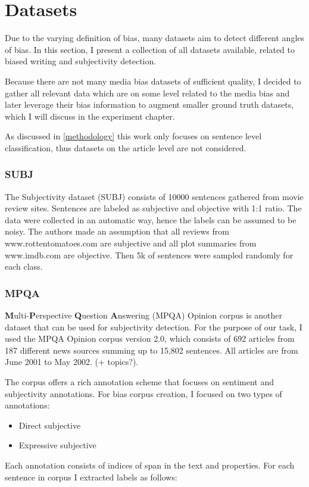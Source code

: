 \chapter{Datasets} \label{datasets}
Due to the varying definition of bias, many datasets aim to detect different angles of bias. In this section, I present a collection of all datasets available, related to biased writing and subjectivity detection.

Because there are not many media bias datasets of sufficient quality, I decided to gather all relevant data which are on some level related to the media bias and later leverage their bias information to augment smaller ground truth datasets, which I will discuss in the experiment chapter.

As discussed in \ref{methodology} this work only focuses on sentence level classification, thus datasets on the article level are not considered.



\subsection{SUBJ}
The Subjectivity dataset (SUBJ) \cite{Pang+Lee:04a} consists of 10000 sentences gathered from movie review sites. Sentences are labeled as subjective and objective with 1:1 ratio. The data were collected in an automatic way, hence the labels can be assumed to be noisy. The authors made an assumption that all reviews from www.rottentomatoes.com are subjective and all plot summaries from www.imdb.com are objective. Then 5k of sentences were sampled randomly for each class.




\subsection{MPQA}
\textbf{M}ulti-\textbf{P}erspective \textbf{Q}uestion \textbf{A}nswering (MPQA) Opinion corpus is another dataset that can be used for subjectivity detection. For the purpose of our task, I used the MPQA Opinion corpus version 2.0, which consists of 692 articles from 187 different news sources summing up to 15,802 sentences. All articles are from June 2001 to May 2002. (+ topics?).

The corpus offers a rich annotation scheme \cite{wiebe2005annotating} that focuses on sentiment and subjectivity annotations. For bias corpus creation, I focused on two types of annotations:
\begin{itemize}
    \item Direct subjective
    \item Expressive subjective
\end{itemize}
Each annotation consists of indices of span in the text and properties. For each sentence in corpus I extracted labels as follows:

